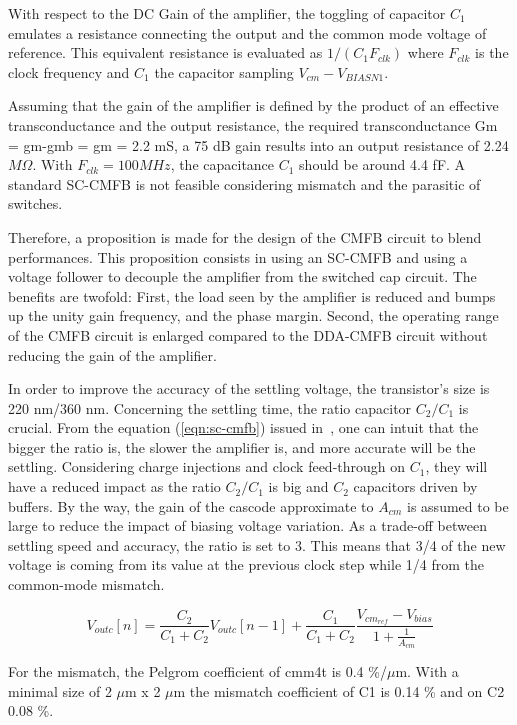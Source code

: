 With respect to the DC Gain of the amplifier, the toggling of capacitor \(C_1 \) emulates a resistance connecting the output and the common mode voltage of reference. This equivalent resistance is evaluated as \(1/(C_1 F_{clk}) \) where \(F_{clk} \) is the clock frequency and \(C_1 \) the capacitor sampling \(V_{cm}-V_{BIASN1}\). 

Assuming that the gain of the amplifier is defined by the product of an effective transconductance and the output resistance, the required transconductance Gm = gm-gmb = gm = 2.2 mS, a 75 dB gain results into an output resistance of 2.24 \(M\Omega \). With \(F_{clk} = 100 MHz \), the capacitance \(C_1 \) should be around 4.4 fF. A standard SC-CMFB is not feasible considering mismatch and the parasitic of switches.

Therefore, a proposition is made for the design of the CMFB circuit to blend performances. This proposition consists in using an SC-CMFB and using a voltage follower to decouple the amplifier from the switched cap circuit.
The benefits are twofold: First, the load seen by the amplifier is reduced and bumps up the unity gain frequency, and the phase margin. Second, the operating range of the CMFB circuit is enlarged compared to the DDA-CMFB circuit without reducing the gain of the amplifier.

In order to improve the accuracy of the settling voltage, the transistor's size is 220 nm/360 nm. Concerning the settling time, the ratio capacitor \(C_2/C_1 \) is crucial. From the equation (\ref{eqn:sc-cmfb}) issued in~\cite{Choksi2003}, one can intuit that the bigger the ratio is, the slower the amplifier is, and more accurate will be the settling. Considering charge injections and clock feed-through on \(C_1\), they will have a reduced impact as the ratio \(C_2/C_1\) is big and \(C_2\) capacitors driven by buffers. By the way, the gain of the cascode approximate to \(A_{cm} \) is assumed to be large to reduce the impact of biasing voltage variation. As a trade-off between settling speed and accuracy, the ratio is set to 3. This means that 3/4 of the new voltage is coming from its value at the previous clock step while 1/4 from the common-mode mismatch.

\begin{equation}
    \label{eqn:sc-cmfb}
V_{outc}[n] = \frac{C_2}{C_1+C_2} V_{outc}[n-1] + \frac{C_1}{C_1+C_2} \frac{V_{cm_{ref}}-V_{bias}}{1+\frac{1}{A_{cm}}}
\end{equation}

For the mismatch, the Pelgrom coefficient of cmm4t is 0.4 \%/\(\mu \)m. With a minimal size of 2 \(\mu \)m x 2 \(\mu \)m the mismatch coefficient of C1 is 0.14 \% and on C2 0.08 \%.

